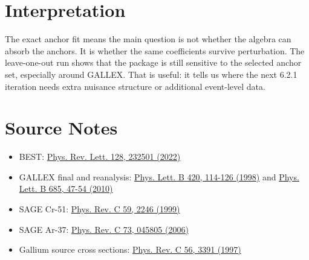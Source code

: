\documentclass[11pt]{article}
\begin{document}
\section*{Interpretation}
The exact anchor fit means the main question is not whether the algebra can absorb the
anchors. It is whether the same coefficients survive perturbation. The leave-one-out run
shows that the package is still sensitive to the selected anchor set, especially around
GALLEX. That is useful: it tells us where the next 6.2.1 iteration needs extra nuisance
structure or additional event-level data.

\section*{Source Notes}
\begin{itemize}
\item BEST: \href{https://doi.org/10.1103/PhysRevLett.128.232501}{Phys. Rev. Lett. 128, 232501 (2022)}
\item GALLEX final and reanalysis: \href{https://doi.org/10.1016/S0370-2693(97)01562-1}{Phys. Lett. B 420, 114-126 (1998)} and \href{https://doi.org/10.1016/j.physletb.2010.01.030}{Phys. Lett. B 685, 47-54 (2010)}
\item SAGE Cr-51: \href{https://doi.org/10.1103/PhysRevC.59.2246}{Phys. Rev. C 59, 2246 (1999)}
\item SAGE Ar-37: \href{https://doi.org/10.1103/PhysRevC.73.045805}{Phys. Rev. C 73, 045805 (2006)}
\item Gallium source cross sections: \href{https://doi.org/10.1103/PhysRevC.56.3391}{Phys. Rev. C 56, 3391 (1997)}
\end{itemize}
\end{document}
